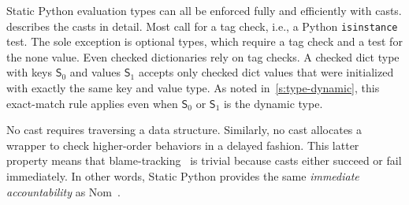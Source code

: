 \documentclass[english,cleveref,submission]{programming}
\newcommand{\SP}{Static Python}
\newcommand{\code}[1]{\texttt{#1}}
\newcommand{\typefont}[1]{\mathsf{#1}}
\newcommand{\spteval}{\typefont{S}}
\begin{document}
\SP{} evaluation types can all be enforced fully and efficiently
with casts.
 describes the casts in detail.
Most call for a tag check, i.e., a Python \code{isinstance} test.
The sole exception is optional types, which require a tag check and a test for the none value.
Even checked dictionaries rely on tag checks.
A checked dict type with keys $\spteval_0$ and values $\spteval_1$ accepts only
checked dict values that were initialized with exactly the same key and value type.
As noted in~\cref{s:type-dynamic}, this exact-match rule applies even when $\spteval_0$
or $\spteval_1$ is the dynamic type.

No cast requires traversing a data structure.
Similarly, no cast allocates a wrapper to check higher-order behaviors in a delayed fashion.
This latter property means that blame-tracking~\cite{ff-icfp-2002} is trivial because
casts either succeed or fail immediately.
In other words, \SP{} provides the same \emph{immediate accountability} as
Nom~\cite{mt-oopsla-2017}.

\end{document}
